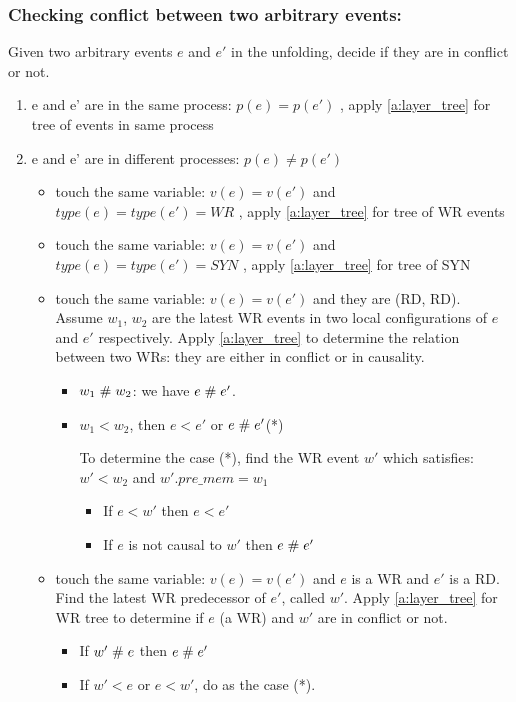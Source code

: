 \documentclass{llncs}
\begin{document}
\subsubsection{Checking conflict between two arbitrary events:}
Given two arbitrary events $e$ and $e'$ in the unfolding, decide if they are in conflict or not.
\begin{enumerate}
	\item e and e' are in the same process: $p(e) = p(e')$ , apply \cref{a:layer_tree} for tree of events in same process
	\item e and e' are in different processes: $p(e)\neq p(e')$
		\begin{itemize}
			\item touch the same variable: $v(e) = v(e')$ and $ type(e) = type(e') = WR$ , apply \cref{a:layer_tree} for tree of WR events 
			\item touch the same variable: $v(e) = v(e')$ and $ type(e) = type(e') = SYN$ , apply \cref{a:layer_tree} for tree of SYN
			\item touch the same variable: $v(e) = v(e')$ and they are (RD, RD). Assume $w_1$, $w_2$ are the latest WR events in two local configurations of $e$ and $e'$ respectively. Apply \cref{a:layer_tree} to determine the relation between two WRs: they are either in conflict or in causality.
			\begin{itemize}
				\item
					$w_1 \mathrel{\#} w_2$: we have $e \mathrel{\#} e'$.  
				\item
					$w_1 < w_2$, then $e < e'$ or $e \mathrel{\#} e'$(*)
				
				 To determine the case (*), find the WR event $w'$ which satisfies: $w'< w_2$ and $w'.pre\_mem = w_1 $
				\begin{itemize}
					\item
						If $e < w'$ then $e < e'$
					\item
						If $e$ is not causal to $w'$ then $e \mathrel{\#} e'$
				\end{itemize}					
				
			\end{itemize}
			\item 
				touch the same variable: $v(e) = v(e')$ and $e$ is a WR and $e'$ is a RD. Find the latest WR predecessor of $e'$, called $w'$. Apply  \cref{a:layer_tree} for WR tree to determine if $e$ (a WR) and $w'$ are in conflict or not.
				\begin{itemize}
					\item
						If $w'\mathrel{\#} e$ then $e \mathrel{\#} e'$
					\item
						If $ w'< e$ or $e < w'$, do as the case (*).
				\end{itemize}
				

\end{itemize}
\end{enumerate}
\end{document}
